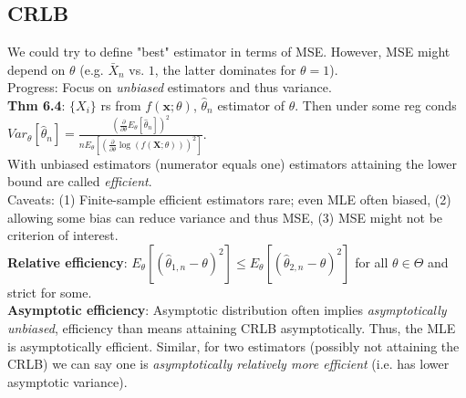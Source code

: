 \subsection{CRLB}
We could try to define "best" estimator in terms of MSE. However, MSE might depend on $\theta$ (e.g. $\bar{X}_n$ vs. $1$, the latter dominates for $\theta = 1$).\\
Progress: Focus on \textit{unbiased} estimators and thus variance.\\
\textbf{Thm 6.4}: $\{X_i\}$ rs from $f(\textbf{x};\theta)$, $\hat{\theta}_n$ estimator of $\theta$. Then under some reg conds $Var_\theta[\hat{\theta}_n] = \frac{(\frac{\partial}{\partial\theta}E_\theta[\hat{\theta}_n])^2}{nE_\theta[(\frac{\partial}{\partial\theta}\log(f(\textbf{X};\theta)))^2]}$.\\
With unbiased estimators (numerator equals one) estimators attaining the lower bound are called \textit{efficient}.\\
Caveats: (1) Finite-sample efficient estimators rare; even MLE often biased, (2) allowing some bias can reduce variance and thus MSE, (3) MSE might not be criterion of interest.\\
\textbf{Relative efficiency}: $E_\theta[(\hat{\theta}_{1,n}-\theta)^2] \leq E_\theta[(\hat{\theta}_{2,n}-\theta)^2]$ for all $\theta\in\Theta$ and strict for some.\\
\textbf{Asymptotic efficiency}: Asymptotic distribution often implies \textit{asymptotically unbiased}, efficiency than means attaining CRLB asymptotically. Thus, the MLE is asymptotically efficient. Similar, for two estimators (possibly not attaining the CRLB) we can say one is \textit{asymptotically relatively more efficient} (i.e. has lower asymptotic variance).